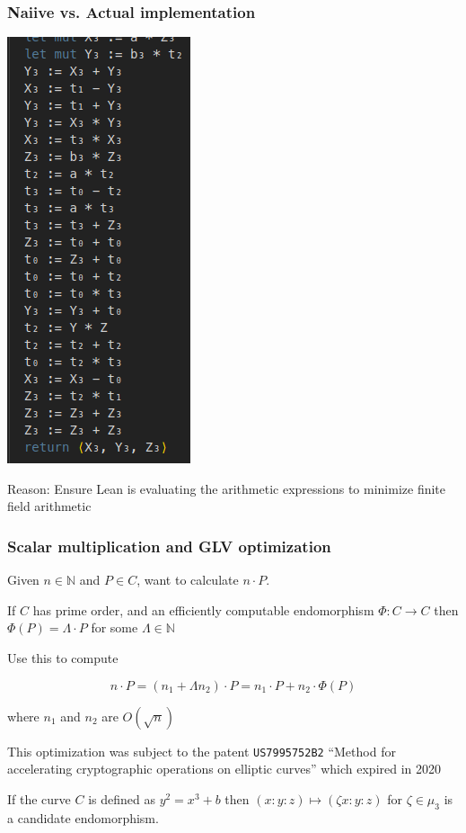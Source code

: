 \documentclass[options]{beamer}
\begin{document}
\begin{frame}
    \frametitle{Naiive vs. Actual implementation}
    \begin{center}
    \includegraphics[height = .70\textheight]{img/screenshot.png}
    \end{center}

    Reason: Ensure Lean is evaluating the arithmetic expressions to minimize finite field arithmetic
\end{frame}

\begin{frame}[fragile]
    \frametitle{Scalar multiplication and GLV optimization}

    Given $n \in \mathbb{N}$ and $P \in C$, want to calculate $n \cdot P$.

    If $C$ has prime order, and an efficiently computable endomorphism $\Phi : C \to C$ then
    $\Phi(P) = \Lambda \cdot P$ for some $\Lambda \in \mathbb{N}$

    Use this to compute 

    $$n \cdot P = (n_1 + \Lambda n_2) \cdot P = n_1 \cdot P + n_2 \cdot \Phi(P)$$

    where $n_1$ and $n_2$ are $O(\sqrt n)$

    This optimization was subject to the patent \verb+US7995752B2+
    ``Method for accelerating cryptographic operations on elliptic curves''
    which expired in 2020

    If the curve $C$ is defined as $y^2 = x^3 + b$ then $(x : y : z) \mapsto (\zeta x : y : z)$ for $\zeta \in \mu_3$ is a candidate endomorphism.

\end{frame}
\end{document}
